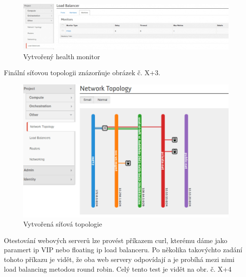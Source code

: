 \begin{figure}[h]
\begin{centering}
\includegraphics[scale=0.45]{images/lbaas3}
\par\end{centering}
\caption{Vytvořený health monitor\label{fig:lbaas3}}
\end{figure}

Finální síťovou topologii znázorňuje obrázek č. X+3. 


\begin{figure}[h]
\begin{centering}
\includegraphics[scale=0.45]{images/lbaas_topologie}
\par\end{centering}
\caption{Vytvořená síťová topologie\label{fig:lbaas_topologie}}
\end{figure}

Otestování webových serverů lze provést příkazem curl, kterému dáme jako paramert ip VIP nebo floating ip load balanceru. Po několika takovýchto zadání tohoto příkazu je vidět, že oba web servery odpovídají a je probíhá mezi nimi load balancing metodou round robin.  Celý tento test je vidět na obr. č. X+4

